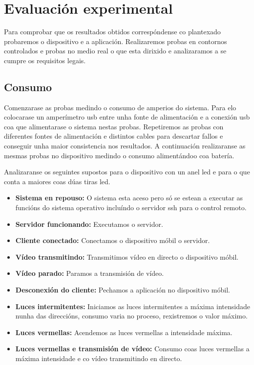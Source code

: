 \chapter{Evaluación experimental}
\label{chap:evaluacion_experimenal}
Para comprobar que os resultados obtidos correspóndense co plantexado probaremos o dispositivo e a aplicación. Realizaremos probas en contornos controlados e probas no medio real o que esta dirixido e analizaramos a se cumpre os requisitos legais.

\section{Consumo}

Comenzarase as probas medindo o consumo de amperios do sistema. Para elo colocarase un amperímetro usb entre unha fonte de alimentación e a conexión usb coa que alimentarase o sistema nestas probas. Repetiremos as probas con diferentes fontes de alimentación e distintos cables para descartar fallos e conseguir unha maior consistencia nos resultados. A continuación realizaranse as mesmas probas no dispositivo medindo o consumo alimentándoo coa batería.

Analizaranse os seguintes supostos para o dispositivo con un anel led e para o que conta a maiores coas dúas tiras led.
\begin{itemize}
    \item \textbf{Sistema en repouso: }
    O sistema esta aceso pero só se estean a executar as funcións do sistema operativo incluíndo o servidor ssh para o control remoto.
    \item \textbf{Servidor funcionando:}
    Executamos o servidor.
    \item \textbf{Cliente conectado:}
    Conectamos o dispositivo móbil o servidor.
    \item \textbf{Vídeo transmitindo:}
    Transmitimos vídeo en directo o dispositivo móbil.
    \item \textbf{Vídeo parado:}
    Paramos a transmisión de vídeo.
    \item \textbf{Desconexión do cliente:}
    Pechamos a aplicación no dispositivo móbil.
    \item \textbf{Luces intermitentes:}
    Iniciamos as luces intermitentes a máxima intensidade nunha das direccións, consumo varia no proceso, rexistremos o valor máximo.
    \item \textbf{Luces vermellas:}
    Acendemos as luces vermellas a intensidade máxima.
    \item \textbf{Luces vermellas e transmisión de vídeo:}
    Consumo coas luces vermellas a máxima intensidade e co vídeo transmitindo en directo.
\end{itemize}

